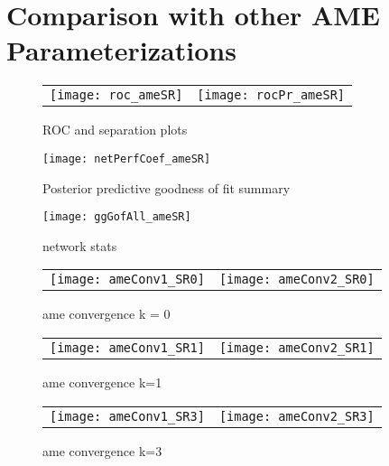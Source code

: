 \section{Comparison with other AME Parameterizations}



% 

\begin{figure}[ht]
	\centering
	\begin{tabular}{cc}
	\texttt{[image: roc\_ameSR]} & 
	\texttt{[image: rocPr\_ameSR]}
	\end{tabular}
	\caption{ROC and separation plots}
	\label{fig:roc_latentSpace}
\end{figure}

\begin{figure}[ht]
	\centering
	\texttt{[image: netPerfCoef\_ameSR]}
	\caption{Posterior predictive goodness of fit summary}
	\label{fig:netPerfCoef_ameSR}
\end{figure}

\begin{figure}[ht]
	\centering
	\texttt{[image: ggGofAll\_ameSR]}
	\caption{network stats }
	\label{fig:gofAll_ameSR}
\end{figure}
\FloatBarrier

\newpage
\begin{figure}[ht]
	\centering
	\begin{tabular}{cc}
	\texttt{[image: ameConv1\_SR0]} &
	\texttt{[image: ameConv2\_SR0]}
	\end{tabular}
	\caption{ame convergence k = 0}
	\label{fig:ameConv}
\end{figure}

\begin{figure}[ht]
	\centering
	\begin{tabular}{cc}
	\texttt{[image: ameConv1\_SR1]} &
	\texttt{[image: ameConv2\_SR1]}
	\end{tabular}
	\caption{ame convergence k=1}
	\label{fig:ameConv}
\end{figure}
\FloatBarrier
\newpage

\begin{figure}[ht]
	\centering
	\begin{tabular}{cc}
	\texttt{[image: ameConv1\_SR3]} &
	\texttt{[image: ameConv2\_SR3]}
	\end{tabular}
	\caption{ame convergence k=3}
	\label{fig:ameConv}
\end{figure}

